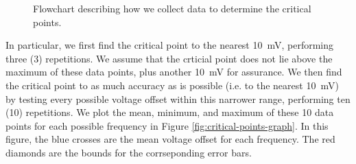 \begin{figure}[!htb]
    \caption{
        \label{fig:data-collection-flowchart}
        Flowchart describing how we collect data to determine the critical
        points.
    }
\end{figure}

In particular, we first find the critical point to the nearest 10~mV, performing
three (3) repetitions. We assume that the crticial point does not lie above the
maximum of these data points, plus another 10~mV for assurance. We then find the
critical point to as much accuracy as is possible (i.e. to the nearest 10~mV)
by testing every possible voltage offset within this narrower range, performing
ten (10) repetitions. We plot the mean, minimum, and maximum of these 10 data
points for each possible frequency in Figure \ref{fig:critical-points-graph}.
In this figure, the blue crosses are the mean voltage offset for each frequency.
The red diamonds are the bounds for the corrseponding error bars.

